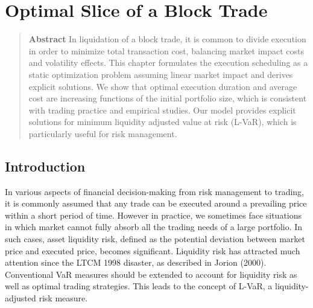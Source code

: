 
\chapter{Optimal Slice of a Block Trade}\label{chap_b}

\def\keymtx{\A^{-1}\S}





\begin{quote}
{\bf Abstract} \quad In liquidation of a block trade, it is common to divide execution in order to minimize total transaction cost, balancing market impact costs and volatility effects.  This chapter formulates the execution scheduling as a static optimization problem assuming linear market impact and derives explicit solutions. We show that optimal execution duration and average cost are increasing functions of the initial portfolio size, which is consistent with trading practice and empirical studies.  Our model provides explicit solutions for minimum liquidity adjusted value at risk (L-VaR), which is particularly useful for risk management.

\vspace*{0.5cm}

\end{quote}

\section{Introduction}\label{sec_b1}

In various aspects of financial decision-making from risk management to trading, it is commonly assumed that any trade can be executed around a prevailing price within a short period of time.  However in practice, we sometimes face situations in which market cannot fully absorb all the trading needs of a large portfolio.  In such cases, asset liquidity risk, defined as the potential deviation between market price and executed price, becomes significant.  Liquidity risk has attracted much attention since the LTCM 1998 disaster, as described in Jorion (2000).  Conventional VaR measures should be extended to account for liquidity risk as well as optimal trading strategies.  This leads to the concept of L-VaR, a liquidity-adjusted risk measure. 

